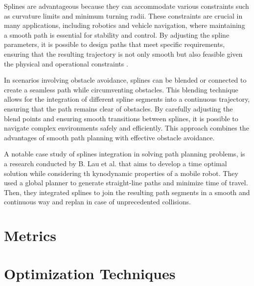 Splines are advantageous because they can accommodate various constraints such as curvature limits 
and minimum turning radii. These constraints are crucial in many applications, including robotics 
and vehicle navigation, where maintaining a smooth path is essential for stability and control. 
By adjusting the spline parameters, it is possible to design paths that meet specific requirements, 
ensuring that the resulting trajectory is not only smooth but also feasible given the physical and 
operational constraints \cite{R30}.

In scenarios involving obstacle avoidance, splines can be blended or connected to create a seamless 
path while circumventing obstacles. This blending technique allows for the integration of different 
spline segments into a continuous trajectory, ensuring that the path remains clear of obstacles. 
By carefully adjusting the blend points and ensuring smooth transitions between splines, it is 
possible to navigate complex environments safely and efficiently. This approach combines the 
advantages of smooth path planning with effective obstacle avoidance.


A notable case study of splines integration in solving path planning problems, is a research conducted 
by B. Lau et al. \cite{R30} that aims to develop a time optimal solution while considering th kynodynamic 
properties of a mobile robot. They used a global planner to generate straight-line paths and minimize time 
of travel. Then, they  integrated splines to join the resulting path segments in a smooth and continuous 
way and replan in case of unprecedented collisions.



\section{Metrics}
\section{Optimization Techniques}








